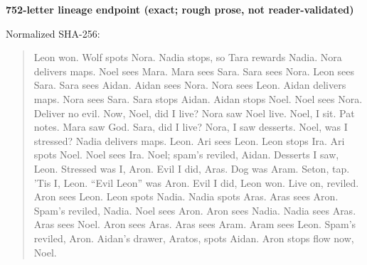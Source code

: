 \par\medskip
\noindent\textbf{752-letter lineage endpoint (exact; rough prose, not reader-validated)}\par
{\raggedright\noindent Normalized SHA-256: \par}
\begin{quote}\small\raggedright
Leon won. Wolf spots Nora. Nadia stops, so Tara rewards Nadia. Nora delivers maps. Noel sees Mara. Mara sees Sara. Sara sees Nora. Leon sees Sara. Sara sees Aidan. Aidan sees Nora. Nora sees Leon. Aidan delivers maps. Nora sees Sara. Sara stops Aidan. Aidan stops Noel. Noel sees Nora. Deliver no evil. Now, Noel, did I live? Nora saw Noel live. Noel, I sit. Pat notes. Mara saw God. Sara, did I live? Nora, I saw desserts. Noel, was I stressed? Nadia delivers maps. Leon. Ari sees Leon. Leon stops Ira. Ari spots Noel. Noel sees Ira. Noel; spam's reviled, Aidan. Desserts I saw, Leon. Stressed was I, Aron. Evil I did, Aras. Dog was Aram. Seton, tap. 'Tis I, Leon. ``Evil Leon'' was Aron. Evil I did, Leon won. Live on, reviled. Aron sees Leon. Leon spots Nadia. Nadia spots Aras. Aras sees Aron. Spam's reviled, Nadia. Noel sees Aron. Aron sees Nadia. Nadia sees Aras. Aras sees Noel. Aron sees Aras. Aras sees Aram. Aram sees Leon. Spam's reviled, Aron. Aidan's drawer, Aratos, spots Aidan. Aron stops flow now, Noel.
\end{quote}
